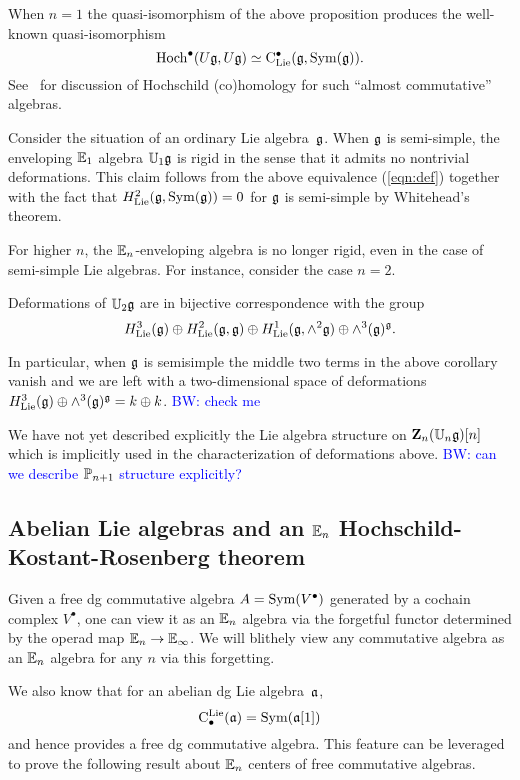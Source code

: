 \documentclass[11pt]{amsart}
\numberwithin{equation}{section}
\def\brian{\textcolor{blue}{BW: }\textcolor{blue}}
\begin{document}
When $n=1$ the quasi-isomorphism of the above proposition produces the well-known quasi-isomorphism
\[
{\rm Hoch}^\bullet(U \mathfrak g , U \mathfrak g) \simeq {\rm C}_{{\rm Lie}}^\bullet(\mathfrak g , {\rm Sym}(\mathfrak g)).
\]
See~\cite{LodayCyclicBook} for discussion of Hochschild (co)homology for such ``almost commutative'' algebras. 

Consider the situation of an ordinary Lie algebra~$\mathfrak g$.
When $\mathfrak g$ is semi-simple, the enveloping $\mathbb E_1$ algebra $\mathbb U_1 \mathfrak g$ is rigid in the sense that it admits no nontrivial deformations. 
This claim follows from the above equivalence (\ref{eqn:def}) together with the fact that $H_{\rm Lie}^2(\mathfrak g , {\rm Sym}(\mathfrak g)) = 0$ for $\mathfrak g$ is semi-simple by Whitehead's theorem. 

For higher $n$, the $\mathbb E_n$-enveloping algebra is no longer rigid, even in the case of semi-simple Lie algebras. 
For instance, consider the case $n=2$.
\begin{cor}
Deformations of $\mathbb U_2 \mathfrak g$ are in bijective correspondence with the group
\[
H^3_{\rm Lie}(\mathfrak g) \oplus H^2_{\rm Lie}(\mathfrak g , \mathfrak g) \oplus H^1_{\rm Lie}(\mathfrak g , \wedge^2 \mathfrak g) \oplus \wedge^3(\mathfrak g)^\mathfrak g .
\]
\end{cor}

In particular, when $\mathfrak g$ is semisimple the middle two terms in the above corollary vanish and we are left with a two-dimensional space of deformations $H^3_{\rm Lie}(\mathfrak g) \oplus \wedge^3 (\mathfrak g)^\mathfrak g = k \oplus k$. \brian{check me}

We have not yet described explicitly the Lie algebra structure on $\mathbf Z_n(\mathbb U_n \mathfrak g)[n]$ which is implicitly used in the characterization of deformations above. 
\brian{can we describe $\mathbb P_{n+1}$ structure explicitly?}

\subsection{Abelian Lie algebras and an $\mathbb E_n$ Hochschild-Kostant-Rosenberg theorem}

Given a free dg commutative algebra $A = {\rm Sym}(V^\bullet)$ generated by a cochain complex $V^\bullet$,
one can view it as an $\mathbb E_n$ algebra via the forgetful functor determined by the operad map $\mathbb E_n \to \mathbb E_\infty$.
We will blithely view any commutative algebra as an $\mathbb E_n$ algebra for any $n$ via this forgetting.

We also know that for an abelian dg Lie algebra~${\frak a}$, 
\[
{\rm C}^{\rm Lie}_\bullet({\frak a}) = {\rm Sym}({\frak a}[1])
\]
and hence provides a free dg commutative algebra.
This feature can be leveraged to prove the following result about $\mathbb E_n$ centers of free commutative algebras.
\end{document}
